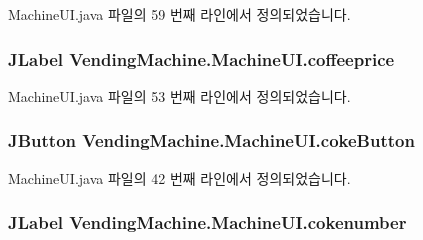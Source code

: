 Machine\+U\+I.\+java 파일의 59 번째 라인에서 정의되었습니다.

\subsubsection[{\texorpdfstring{coffeeprice}{coffeeprice}}]{\setlength{\rightskip}{0pt plus 5cm}J\+Label Vending\+Machine.\+Machine\+U\+I.\+coffeeprice\hspace{0.3cm}{\ttfamily [private]}}\hypertarget{class_vending_machine_1_1_machine_u_i_a07827eeed491a4ff5382507b68af2811}{}\label{class_vending_machine_1_1_machine_u_i_a07827eeed491a4ff5382507b68af2811}


Machine\+U\+I.\+java 파일의 53 번째 라인에서 정의되었습니다.

\subsubsection[{\texorpdfstring{coke\+Button}{cokeButton}}]{\setlength{\rightskip}{0pt plus 5cm}J\+Button Vending\+Machine.\+Machine\+U\+I.\+coke\+Button\hspace{0.3cm}{\ttfamily [private]}}\hypertarget{class_vending_machine_1_1_machine_u_i_a2c0d9b4f7a1068c8073f20c4bf767fa4}{}\label{class_vending_machine_1_1_machine_u_i_a2c0d9b4f7a1068c8073f20c4bf767fa4}


Machine\+U\+I.\+java 파일의 42 번째 라인에서 정의되었습니다.

\subsubsection[{\texorpdfstring{cokenumber}{cokenumber}}]{\setlength{\rightskip}{0pt plus 5cm}J\+Label Vending\+Machine.\+Machine\+U\+I.\+cokenumber\hspace{0.3cm}{\ttfamily [private]}}\hypertarget{class_vending_machine_1_1_machine_u_i_a902358a427129e6a67fd5ddaa92661a8}{}\label{class_vending_machine_1_1_machine_u_i_a902358a427129e6a67fd5ddaa92661a8}


